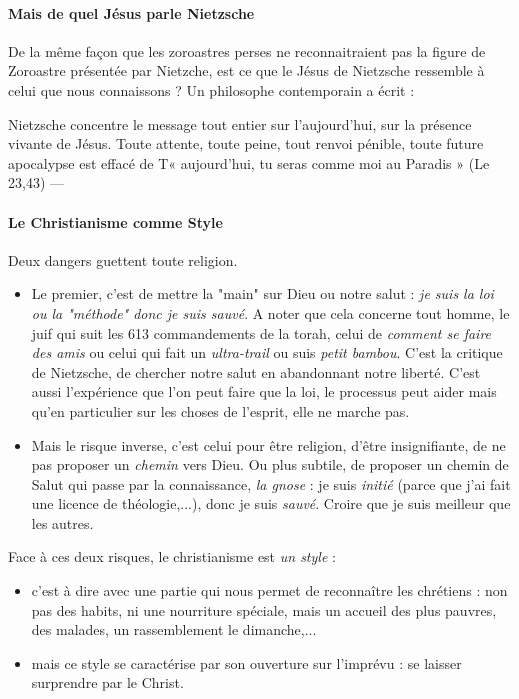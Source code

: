 \paragraph{Mais de quel Jésus parle Nietzsche} De la même façon que les zoroastres perses ne reconnaitraient pas la figure de Zoroastre présentée par Nietzche, est ce que le Jésus de Nietzsche ressemble à celui que nous connaissons ? Un philosophe contemporain a écrit : 

\begin{singlequote}
    Nietzsche concentre le message tout entier sur l'aujourd'hui, sur la présence vivante de Jésus. Toute attente, toute peine, tout renvoi pénible, toute future apocalypse est effacé de T« aujourd'hui, tu seras comme moi au Paradis » (Le 23,43) —
\end{singlequote}


\paragraph{Le Christianisme comme Style} Deux dangers guettent toute religion. 
\begin{itemize}
    \item Le premier, c'est de mettre la "main" sur Dieu ou notre salut : \textit{je suis la loi ou la "méthode" donc je suis sauvé}. A noter que cela concerne tout homme, le juif qui suit les 613 commandements de la torah, celui de \textit{comment se faire des amis} ou celui qui fait un \textit{ultra-trail} ou suis \textit{petit bambou}. C'est la critique de Nietzsche, de chercher notre salut en abandonnant notre liberté. C'est aussi l'expérience que l'on peut faire que la loi, le processus peut aider mais qu'en particulier sur les choses de l'esprit, elle ne marche pas.
    \item Mais le risque inverse, c'est celui pour être religion, d'être insignifiante, de ne pas proposer un \textit{chemin} vers Dieu. Ou plus subtile, de proposer un chemin de Salut qui passe par la connaissance, \textit{la gnose} : je suis \textit{initié} (parce que j'ai fait une licence de théologie,...), donc je suis \textit{sauvé}. Croire que je suis meilleur que les autres.
\end{itemize}

Face à ces deux risques, le christianisme est \textit{un style } :
\begin{itemize}
    \item c'est à dire avec une partie qui nous permet de reconnaître les chrétiens : non pas des habits, ni une nourriture spéciale, mais un accueil des plus pauvres, des malades, un rassemblement le dimanche,... 
    \item mais ce style se caractérise par son ouverture sur l'imprévu : se laisser surprendre par le Christ.
\end{itemize}

